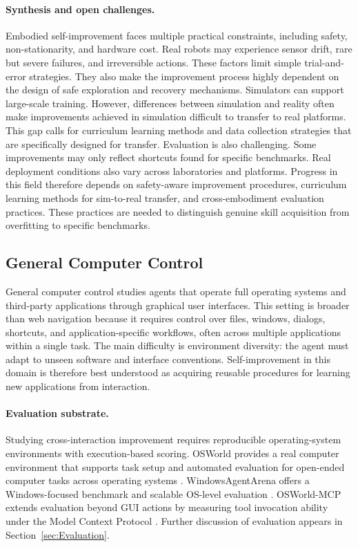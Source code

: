\documentclass{article}
\begin{document}
\paragraph{Synthesis and open challenges.}
Embodied self-improvement faces multiple practical constraints, including safety, non-stationarity, and hardware cost. Real robots may experience sensor drift, rare but severe failures, and irreversible actions. These factors limit simple trial-and-error strategies. They also make the improvement process highly dependent on the design of safe exploration and recovery mechanisms. Simulators can support large-scale training. However, differences between simulation and reality often make improvements achieved in simulation difficult to transfer to real platforms. This gap calls for curriculum learning methods and data collection strategies that are specifically designed for transfer. Evaluation is also challenging. Some improvements may only reflect shortcuts found for specific benchmarks. Real deployment conditions also vary across laboratories and platforms. Progress in this field therefore depends on safety-aware improvement procedures, curriculum learning methods for sim-to-real transfer, and cross-embodiment evaluation practices. These practices are needed to distinguish genuine skill acquisition from overfitting to specific benchmarks.


\subsection{General Computer Control}

General computer control studies agents that operate full operating systems and third-party applications through graphical user interfaces. This setting is broader than web navigation because it requires control over files, windows, dialogs, shortcuts, and application-specific workflows, often across multiple applications within a single task. The main difficulty is environment diversity: the agent must adapt to unseen software and interface conventions. Self-improvement in this domain is therefore best understood as acquiring reusable procedures for learning new applications from interaction.

\paragraph{Evaluation substrate.}
Studying cross-interaction improvement requires reproducible operating-system environments with execution-based scoring. OSWorld provides a real computer environment that supports task setup and automated evaluation for open-ended computer tasks across operating systems \citep{xie2024osworldbenchmarkingmultimodalagents}. WindowsAgentArena offers a Windows-focused benchmark and scalable OS-level evaluation \citep{bonatti2024windowsagentarenaevaluating}. OSWorld-MCP extends evaluation beyond GUI actions by measuring tool invocation ability under the Model Context Protocol \citep{jia2025osworldmcpbenchmarkingmcptool}. Further discussion of evaluation appears in Section~\ref{sec:Evaluation}.
\end{document}
